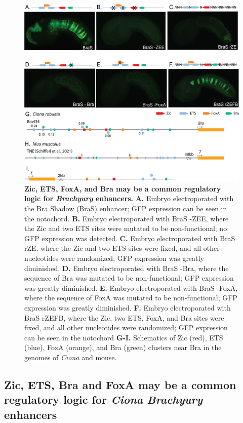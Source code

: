 \begin{figure}[p]
    \centering
    \includegraphics[scale=.74]{2_figures/Fig5_BraS-Dissection.png}
    \caption[Zic, ETS, FoxA, and Bra may be a common regulatory logic for \textit{Brachyury} enhancers]{\textbf{Zic, ETS, FoxA, and Bra may be a common regulatory logic for \textit{Brachyury} enhancers.} \textbf{A.} Embryo electroporated with the Bra Shadow (BraS) enhancer; GFP expression can be seen in the notochord. \textbf{B.} Embryo electroporated with BraS -ZEE, where the Zic and two ETS sites were mutated to be non-functional; no GFP expression was detected. \textbf{C.} Embryo electroporated with BraS rZE, where the Zic and two ETS sites were fixed, and all other nucleotides were randomized; GFP expression was greatly diminished. \textbf{D.} Embryo electroporated with BraS -Bra, where the sequence of Bra was mutated to be non-functional; GFP expression was greatly diminished. \textbf{E.} Embryo electroporated with BraS -FoxA, where the sequence of FoxA was mutated to be non-functional; GFP expression was greatly diminished. \textbf{F.} Embryo electroporated with BraS rZEFB, where the Zic, two ETS, FoxA, and Bra sites were fixed, and all other nucleotides were randomized; GFP expression can be seen in the notochord \textbf{G-I.} Schematics of Zic (red), ETS (blue), FoxA (orange), and Bra (green) clusters near Bra in the genomes of \textit{Ciona} and mouse. }
    \label{fig:5 brachyury shadow dissection}
\end{figure}

\subsection{Zic, ETS, Bra and FoxA may be a common regulatory logic for \textit{Ciona} \textit{Brachyury} enhancers}

